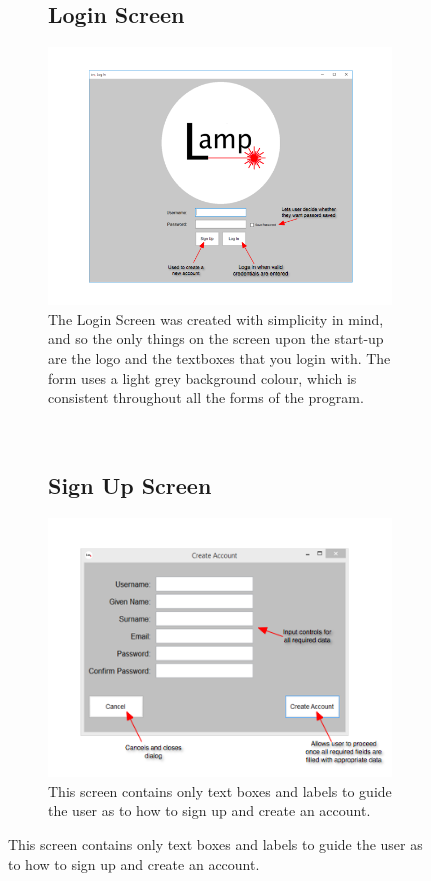 \documentclass[oneside,openany,11pt,a4paper]{report}
\begin{document}
\begin{figure}[H]
	\begin{subfigure}[t]{0.5\textwidth}
		\subsection{Login Screen}
		\centering
		\includegraphics[width=\textwidth]{screen/login.png}
		\caption{The Login Screen was created with simplicity in mind, and so the only things on the screen upon the start-up are the logo and the textboxes that you login with. The form uses a light grey background colour, which is consistent throughout all the forms of the program.}
	\end{subfigure}
	~
	\begin{subfigure}[t]{0.5\textwidth}
		\subsection{Sign Up Screen}
	\centering
	\includegraphics[width=\textwidth]{screen/signup.png}
	\caption{This screen contains only text boxes and labels to guide the user as to how to sign up and create an account.}
	\end{subfigure}
\end{figure}
\end{document}
